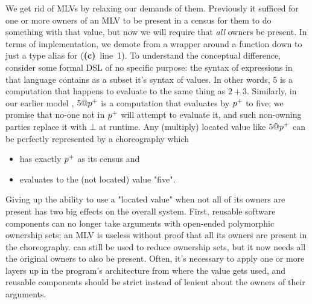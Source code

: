 We get rid of MLVs by relaxing our demands of them.
Previously it sufficed for one or more owners of an MLV to be present in a census for them to do something with that value,
but now we will require that \emph{all} owners be present.
In terms of implementation,
we demote  from a  wrapper around a function down to just a type alias for 
(\textbf{(c)}~line~1).
To understand the conceptual difference,
consider some formal DSL of no specific purpose:
the syntax of expressions in that language contains as a subset it's syntax of values.
In other words, $5$ is a computation that happens to evaluate to the same thing as $2+3$.
Similarly, in our earlier model \HLSCentral, $5@{p^{+}}$ is a computation that evaluates by ${p^{+}}$ to five;
we promise that no-one not in ${p^{+}}$ will attempt to evaluate it, and such non-owning parties replace it with $\bot$ at runtime.
Any (multiply) located value like $5@{p^{+}}$ can be perfectly represented by a choreography which
\begin{itemize}
	\item has exactly ${p^{+}}$ as its census and
	\item evaluates to the (not located) value "five".
\end{itemize}

Giving up the ability to use a "located value" when not all of its owners are present has two big effects on the overall system.
First, reusable software components can no longer take arguments with open-ended polymorphic ownership sets;
an MLV is useless without proof that all its owners are present in the choreography.
 can still be used to reduce ownership sets, but it now needs all the original owners to also be present.
Often, it's necessary to apply  one or more layers up in the program's architecture from where the value gets used,
and reusable components should be strict instead of lenient about the owners of their arguments.

